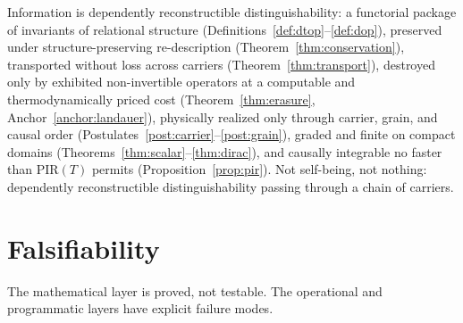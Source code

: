 \documentclass[11pt,a4paper]{article}
\theoremstyle{definition}
\theoremstyle{remark}
\newcommand{\PIR}{\mathrm{PIR}}
\begin{document}
\begin{tcolorbox}[colback=gray!4,colframe=gray!50,title=Core principle (Interpretation)]
Information is dependently reconstructible distinguishability: a functorial package of
invariants of relational structure (Definitions~\ref{def:dtop}--\ref{def:dop}), preserved
under structure-preserving re-description (Theorem~\ref{thm:conservation}), transported
without loss across carriers (Theorem~\ref{thm:transport}), destroyed only by exhibited
non-invertible operators at a computable and thermodynamically priced cost
(Theorem~\ref{thm:erasure}, Anchor~\ref{anchor:landauer}), physically realized only through
carrier, grain, and causal order (Postulates~\ref{post:carrier}--\ref{post:grain}), graded and
finite on compact domains (Theorems~\ref{thm:scalar}--\ref{thm:dirac}), and causally
integrable no faster than $\PIR(T)$ permits (Proposition~\ref{prop:pir}).  Not self-being, not
nothing: dependently reconstructible distinguishability passing through a chain of carriers.
\end{tcolorbox}

\section{Falsifiability}
\label{sec:falsifiability}

The mathematical layer is proved, not testable.  The operational and programmatic layers have
explicit failure modes.
\end{document}

